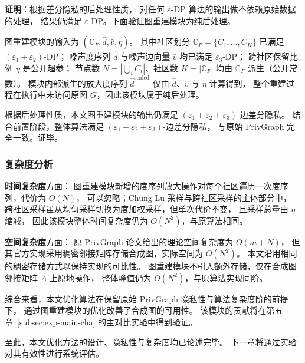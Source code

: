 \par \textbf{证明}：根据差分隐私的后处理性质，
对任何 $\varepsilon$-DP 算法的输出做不依赖原始数据的处理，
结果仍满足 $\varepsilon$-DP。下面验证图重建模块为纯后处理。

\par 图重建模块的输入为 
$(\mathbb{C}_F, \hat{d}, \hat{v}, \eta)$。
其中社区划分 $\mathbb{C}_F = \{C_1, \ldots, C_K\}$ 已满足 $(\varepsilon_1 + \varepsilon_2)$-DP；
噪声度序列 $\hat{d}$ 与噪声边向量 $\hat{v}$ 均已满足 $\varepsilon_3$-DP；
跨社区保留比例 $\eta$ 是公开超参；
节点数 $N = |\bigcup_i C_i|$、社区数 $K = |\mathbb{C}_F|$ 均由 $\mathbb{C}_F$ 派生（公开常数）。
模块内部派生的放大度序列 $\hat{d}^{\mathrm{scaled}}$ 仅由 $\hat{d}$、$\hat{v}$ 与 $\eta$ 计算得到，
整个重建过程在执行中未访问原图 $G$，因此该模块属于纯后处理。

\par 根据后处理性质，本文图重建模块的输出仍满足
$(\varepsilon_1 + \varepsilon_2 + \varepsilon_3)$-边差分隐私。
结合前置阶段，整体算法满足 $(\varepsilon_1 + \varepsilon_2 + \varepsilon_3)$-边差分隐私，
与原始 PrivGraph 完全一致。证毕。

\subsubsection{复杂度分析}

\par \textbf{时间复杂度}方面：
图重建模块新增的度序列放大操作对每个社区遍历一次度序列，代价为 $O(N)$，
可以忽略；Chung-Lu 采样与跨社区采样的主体部分中，
跨社区采样虽从均匀采样切换为度加权采样，但单次代价不变，
且采样总量由 $\eta$ 缩减，
因此该模块整体时间复杂度仍为 $O(N^2)$，与原算法相同。

\par \textbf{空间复杂度}方面：
原 PrivGraph 论文给出的理论空间复杂度为 $O(m + N)$，
但其官方实现采用稠密邻接矩阵存储合成图，实际空间为 $O(N^2)$。
本文沿用相同的稠密存储方式以保持实现的可比性。
图重建模块不引入额外存储，仅在合成图邻接矩阵 $A$ 上原地操作，
整体峰值仍为 $O(N^2)$，与原算法实现同阶。

\par 综合来看，本文优化算法在保留原始 PrivGraph 隐私性与算法复杂度阶的前提下，
通过图重建模块的优化改善了合成图的可用性。
该模块的贡献将在第五章~\autoref{subsec:exp-main-cha} 的主对比实验中得到验证。

\par 至此，本文优化方法的设计、隐私性与复杂度均已论述完毕。
下一章将通过实验对其有效性进行系统评估。


